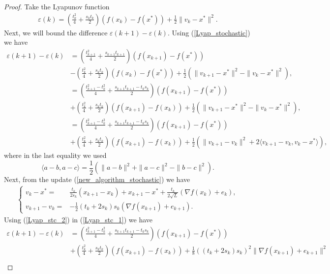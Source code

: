 \documentclass{article}
\theoremstyle{plain}
\theoremstyle{definition}
\theoremstyle{remark}
\begin{document}
\begin{proof}
    Take the Lyapunov function
    \begin{align}\label{Lyap_stochastic}
    \varepsilon(k)= (\frac{t_k^2}{4}+\frac{s_kt_k}{2})(f(x_k)-f(x^*))+\frac{1}{2}\|v_k-x^*\|^2.
    \end{align}
    Next, we will bound the difference $\varepsilon(k+1)-\varepsilon(k)$. Using (\ref{Lyap_stochastic}) we have
    \begin{align}\label{Lyap_stc_1}
        \varepsilon(k+1)-\varepsilon(k)&=(\frac{t_{k+1}^2}{4}+\frac{s_{k+1}t_{k+1}}{2})(f(x_{k+1})-f(x^*))\nonumber\\
        &-(\frac{t_{k}^2}{4}+\frac{s_{k}t_{k}}{2})(f(x_{k})-f(x^*))+\frac{1}{2}(\|v_{k+1}-x^*\|^2-\|v_{k}-x^*\|^2),\nonumber\\
        & = (\frac{t_{k+1}^2-t_k^2}{4}+\frac{s_{k+1}t_{k+1}-t_ks_k}{2})(f(x_{k+1})-f(x^*))\nonumber\\
        &+(\frac{t_{k}^2}{4}+\frac{s_{k}t_{k}}{2})(f(x_{k+1})-f(x_k))+\frac{1}{2}(\|v_{k+1}-x^*\|^2-\|v_{k}-x^*\|^2),\nonumber\\
        &= (\frac{t_{k+1}^2-t_k^2}{4}+\frac{s_{k+1}t_{k+1}-t_ks_k}{2})(f(x_{k+1})-f(x^*))\nonumber\\
        &+(\frac{t_{k}^2}{4}+\frac{s_{k}t_{k}}{2})(f(x_{k+1})-f(x_k))+\frac{1}{2}(\|v_{k+1}-v_k\|^2+2\langle v_{k+1}-v_k,v_k-x^*\rangle),
    \end{align}
    where in the last equality we used 
    $$\langle a-b,a-c\rangle = \frac{1}{2}(\|a-b\|^2+\|a-c\|^2-\|b-c\|^2).$$
    Next, from the update (\ref{new_algorithm_stochastic}) we have
    \begin{align}\label{Lyap_stc_2}
        \left\{\begin{array}{cl}
             v_k-x^*=&\frac{t_k}{2s_k}(x_{k+1}-x_k)+x_{k+1}-x^*+\frac{t_k}{2\sqrt{L}}(\nabla f(x_k)+e_k),  \\
            v_{k+1}-v_k=& -\frac{1}{2}(t_k+2s_k)s_k (\nabla f(x_{k+1})+e_{k+1}).
        \end{array}\right.
    \end{align}
    Using (\ref{Lyap_stc_2}) in (\ref{Lyap_stc_1}) we have
    \begin{align}\label{Lyap_stc_3}
        \varepsilon(k+1)-\varepsilon(k)&=(\frac{t_{k+1}^2-t_k^2}{4}+\frac{s_{k+1}t_{k+1}-t_ks_k}{2})(f(x_{k+1})-f(x^*))\nonumber\\
        &+(\frac{t_{k}^2}{4}+\frac{s_{k}t_{k}}{2})(f(x_{k+1})-f(x_k))+\frac{1}{8}((t_k+2s_k)s_k)^2\|\nabla f(x_{k+1})+e_{k+1}\|^2\nonumber\\

\end{align}
\end{proof}
\end{document}
